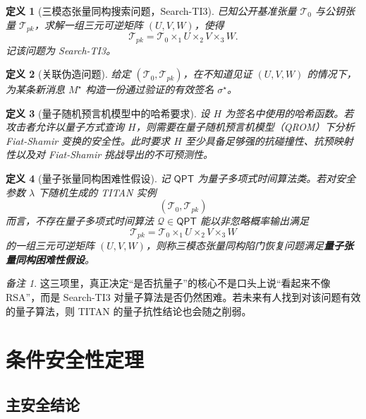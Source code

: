 \documentclass[12pt,a4paper]{article}
\newtheorem{definition}{定义}[section]
\theoremstyle{remark}
\newtheorem{remark}{备注}[section]
\begin{document}
\begin{definition}[三模态张量同构搜索问题，Search-TI3]
已知公开基准张量 $\mathcal{T}_0$ 与公钥张量 $\mathcal{T}_{pk}$，求解一组三元可逆矩阵 $(U,V,W)$，使得
\[
\mathcal{T}_{pk}=\mathcal{T}_0\times_1 U\times_2 V\times_3 W.
\]
记该问题为 Search-TI3。
\end{definition}

\begin{definition}[关联伪造问题]
给定 $(\mathcal{T}_0,\mathcal{T}_{pk})$，在不知道见证 $(U,V,W)$ 的情况下，为某条新消息 $M^\star$ 构造一份通过验证的有效签名 $\sigma^\star$。
\end{definition}

\begin{definition}[量子随机预言机模型中的哈希要求]
设 $H$ 为签名中使用的哈希函数。若攻击者允许以量子方式查询 $H$，则需要在量子随机预言机模型（QROM）下分析 Fiat-Shamir 变换的安全性。此时要求 $H$ 至少具备足够强的抗碰撞性、抗预映射性以及对 Fiat-Shamir 挑战导出的不可预测性。
\end{definition}

\begin{definition}[量子张量同构困难性假设]
记 $\mathsf{QPT}$ 为量子多项式时间算法类。若对安全参数 $\lambda$ 下随机生成的 TITAN 实例
\[
(\mathcal{T}_0,\mathcal{T}_{pk})
\]
而言，不存在量子多项式时间算法 $\mathcal{Q}\in\mathsf{QPT}$ 能以非忽略概率输出满足
\[
\mathcal{T}_{pk}=\mathcal{T}_0\times_1 U\times_2 V\times_3 W
\]
的一组三元可逆矩阵 $(U,V,W)$，则称三模态张量同构陷门恢复问题满足\textbf{量子张量同构困难性假设}。
\end{definition}

\begin{remark}
这三项里，真正决定“是否抗量子”的核心不是口头上说“看起来不像 RSA”，而是 Search-TI3 对量子算法是否仍然困难。若未来有人找到对该问题有效的量子算法，则 TITAN 的量子抗性结论也会随之削弱。
\end{remark}

\section{条件安全性定理}

\subsection{主安全结论}
\end{document}
